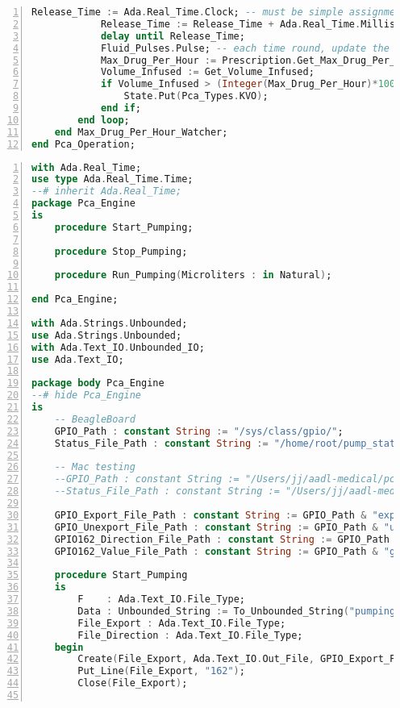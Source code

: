 \begin{lstlisting}[language=ada, gobble=0, numbers=left, caption={\lstinline{Pca_Operation} package}, label={listing:pca_ravenscar:pca_operation}]
            Release_Time := Ada.Real_Time.Clock; -- must be simple assignment
            Release_Time := Release_Time + Ada.Real_Time.Milliseconds(Period);
            delay until Release_Time;
            Fluid_Pulses.Pulse; -- each time round, update the volume infused moving window
            Max_Drug_Per_Hour := Prescription.Get_Max_Drug_Per_Hour;
            Volume_Infused := Get_Volume_Infused;
            if Volume_Infused > (Integer(Max_Drug_Per_Hour)*1000) then -- convert to microliters
                State.Put(Pca_Types.KVO);
            end if;
        end loop;
    end Max_Drug_Per_Hour_Watcher;
end Pca_Operation;
\end{lstlisting} 
\doublespacing


\singlespacing
\begin{lstlisting}[language=ada, gobble=0, numbers=left, caption={\lstinline{Pca_Engine} package}, label={listing:pca_ravenscar:pca_engine}]
with Ada.Real_Time;
use type Ada.Real_Time.Time;
--# inherit Ada.Real_Time;
package Pca_Engine
is
    procedure Start_Pumping;

    procedure Stop_Pumping;

    procedure Run_Pumping(Microliters : in Natural);

end Pca_Engine;

with Ada.Strings.Unbounded;
use Ada.Strings.Unbounded;
with Ada.Text_IO.Unbounded_IO;
use Ada.Text_IO;

package body Pca_Engine
--# hide Pca_Engine
is
    -- BeagleBoard
    GPIO_Path : constant String := "/sys/class/gpio/";
    Status_File_Path : constant String := "/home/root/pump_status.txt";

    -- Mac testing
    --GPIO_Path : constant String := "/Users/jj/aadl-medical/pca-pump-beagleboard/pca_ravenscar/files/";
    --Status_File_Path : constant String := "/Users/jj/aadl-medical/pca-pump-beagleboard/pca_ravenscar/files/pump_status.txt";

    GPIO_Export_File_Path : constant String := GPIO_Path & "export";
    GPIO_Unexport_File_Path : constant String := GPIO_Path & "unexport";
    GPIO162_Direction_File_Path : constant String := GPIO_Path & "gpio162/direction";
    GPIO162_Value_File_Path : constant String := GPIO_Path & "gpio162/value";

    procedure Start_Pumping
    is
        F    : Ada.Text_IO.File_Type;
        Data : Unbounded_String := To_Unbounded_String("pumping");
        File_Export : Ada.Text_IO.File_Type;
        File_Direction : Ada.Text_IO.File_Type;
    begin
        Create(File_Export, Ada.Text_IO.Out_File, GPIO_Export_File_Path);
        Put_Line(File_Export, "162");
        Close(File_Export);


\end{lstlisting}
